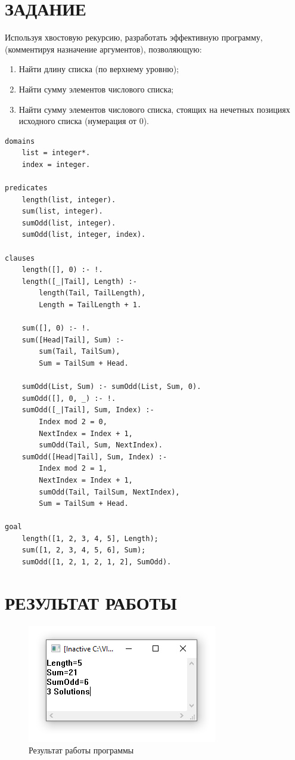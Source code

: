 \section{ЗАДАНИЕ}

Используя хвостовую рекурсию, разработать эффективную программу, (комментируя назначение аргументов), позволяющую:

\begin{enumerate}
    \item Найти длину списка (по верхнему уровню);
    \item Найти сумму элементов числового списка;
    \item Найти сумму элементов числового списка, стоящих на нечетных позициях исходного списка (нумерация от 0).
\end{enumerate}

\begin{lstlisting}[caption=Текст программы]
domains
	list = integer*.
	index = integer.

predicates
	length(list, integer).
	sum(list, integer).
	sumOdd(list, integer).
	sumOdd(list, integer, index).

clauses
	length([], 0) :- !.
	length([_|Tail], Length) :-
		length(Tail, TailLength),
		Length = TailLength + 1.

	sum([], 0) :- !.
	sum([Head|Tail], Sum) :-
		sum(Tail, TailSum),
		Sum = TailSum + Head.

	sumOdd(List, Sum) :- sumOdd(List, Sum, 0).
	sumOdd([], 0, _) :- !.
	sumOdd([_|Tail], Sum, Index) :-
		Index mod 2 = 0,
		NextIndex = Index + 1,
		sumOdd(Tail, Sum, NextIndex).
	sumOdd([Head|Tail], Sum, Index) :-
		Index mod 2 = 1,
		NextIndex = Index + 1,
		sumOdd(Tail, TailSum, NextIndex),
		Sum = TailSum + Head.

goal
	length([1, 2, 3, 4, 5], Length);
	sum([1, 2, 3, 4, 5, 6], Sum);
	sumOdd([1, 2, 1, 2, 1, 2], SumOdd).
\end{lstlisting}

\section{РЕЗУЛЬТАТ РАБОТЫ}

\begin{figure}[H]
    \centering
    \includegraphics{img/result.png}
    \caption{Результат работы программы}
\end{figure}
